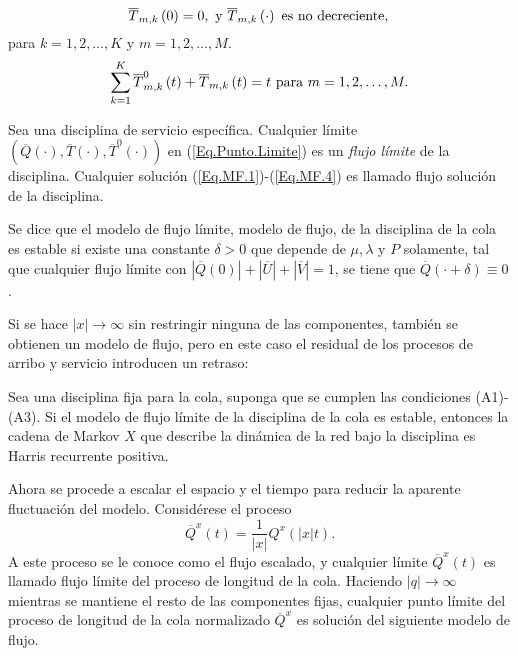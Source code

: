 \begin{equation}\label{Eq.MF.3}
\overline{T}_{m,k}\left(0\right)=0,\textrm{ y }\overline{T}_{m,k}\left(\cdot\right)\textrm{ es no decreciente},\\
\end{equation}
para $k=1,2,\ldots,K$ y $m=1,2,\ldots,M$.\\
\begin{equation}\label{Eq.MF.4}
\sum_{k=1}^{K}\overline{T}_{m,k}^{0}\left(t\right)+\overline{T}_{m,k}\left(t\right)=t\textrm{
para }m=1,2,\ldots,M.\\
\end{equation}


\begin{Def}\label{Def.Modelo.Flujo}
Sea una disciplina de servicio espec\'ifica. Cualquier l\'imite
$\left(\overline{Q}\left(\cdot\right),\overline{T}\left(\cdot\right),\overline{T}^{0}\left(\cdot\right)\right)$
en (\ref{Eq.Punto.Limite}) es un {\em flujo l\'imite} de la
disciplina. Cualquier soluci\'on (\ref{Eq.MF.1})-(\ref{Eq.MF.4})
es llamado flujo soluci\'on de la disciplina.
\end{Def}

\begin{Def}
Se dice que el modelo de flujo l\'imite, modelo de flujo, de la
disciplina de la cola es estable si existe una constante
$\delta>0$ que depende de $\mu,\lambda$ y $P$ solamente, tal que
cualquier flujo l\'imite con
$|\overline{Q}\left(0\right)|+|\overline{U}|+|\overline{V}|=1$, se
tiene que $\overline{Q}\left(\cdot+\delta\right)\equiv0$.
\end{Def}

Si se hace $|x|\rightarrow\infty$ sin restringir ninguna de las
componentes, tambi\'en se obtienen un modelo de flujo, pero en
este caso el residual de los procesos de arribo y servicio
introducen un retraso:
\begin{Teo}\label{Tma.4.2.Dai}
Sea una disciplina fija para la cola, suponga que se cumplen las
condiciones (A1)-(A3). Si el modelo de flujo l\'imite de la
disciplina de la cola es estable, entonces la cadena de Markov $X$
que describe la din\'amica de la red bajo la disciplina es Harris
recurrente positiva.
\end{Teo}

Ahora se procede a escalar el espacio y el tiempo para reducir la
aparente fluctuaci\'on del modelo. Consid\'erese el proceso
\begin{equation}\label{Eq.3.7}
\overline{Q}^{x}\left(t\right)=\frac{1}{|x|}Q^{x}\left(|x|t\right).
\end{equation}
A este proceso se le conoce como el flujo escalado, y cualquier
l\'imite $\overline{Q}^{x}\left(t\right)$ es llamado flujo
l\'imite del proceso de longitud de la cola. Haciendo
$|q|\rightarrow\infty$ mientras se mantiene el resto de las
componentes fijas, cualquier punto l\'imite del proceso de
longitud de la cola normalizado $\overline{Q}^{x}$ es soluci\'on
del siguiente modelo de flujo.


